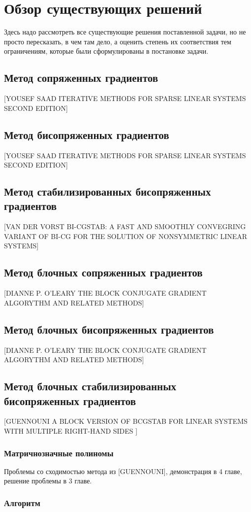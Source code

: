 \section{Обзор существующих решений}
\label{sec:Chapter2} 

Здесь надо рассмотреть все существующие решения поставленной задачи, но не
просто пересказать, в чем там дело, а оценить степень их соответствия тем
ограничениям, которые были сформулированы в постановке задачи.

\subsection{Метод сопряженных градиентов}
[YOUSEF SAAD ITERATIVE METHODS FOR SPARSE LINEAR SYSTEMS SECOND EDITION]
\subsection{Метод бисопряженных градиентов}
[YOUSEF SAAD ITERATIVE METHODS FOR SPARSE LINEAR SYSTEMS SECOND EDITION]
\subsection{Метод стабилизированных бисопряженных градиентов}
[VAN DER VORST BI-CGSTAB: A FAST AND SMOOTHLY CONVEGRING VARIANT OF BI-CG FOR THE SOLUTION OF NONSYMMETRIC LINEAR SYSTEMS]
\subsection{Метод блочных сопряженных градиентов}
[DIANNE P. O'LEARY THE BLOCK CONJUGATE GRADIENT ALGORYTHM AND RELATED METHODS]
\subsection{Метод блочных бисопряженных градиентов}
[DIANNE P. O'LEARY THE BLOCK CONJUGATE GRADIENT ALGORYTHM AND RELATED METHODS]
\subsection{Метод блочных стабилизированных бисопряженных градиентов}
[GUENNOUNI A BLOCK VERSION OF BCGSTAB FOR LINEAR SYSTEMS WITH MULTIPLE RIGHT-HAND SIDES ]
\subsubsection{Матричнозначные полиномы}
 \par Проблемы со сходимостью метода из [GUENNOUNI], демонстрация в 4 главе, решение проблемы в 3 главе.
 \subsubsection{Алгоритм}


\newpage
